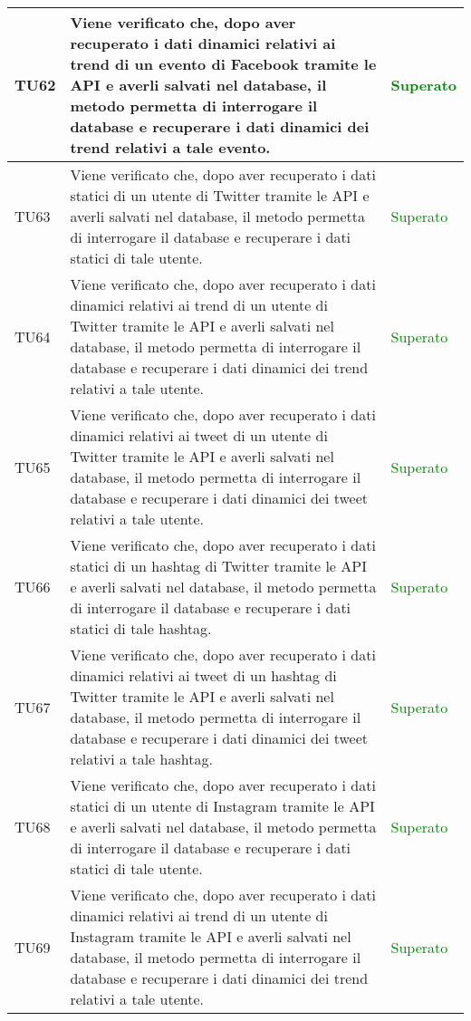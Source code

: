 \begin{center}
\begin{longtable}{| p{2cm} | p{8cm} | p{2.5cm} |}
					\hline	
					TU62 & Viene verificato che, dopo aver recuperato i dati dinamici relativi ai trend di un evento di Facebook tramite le API e averli salvati nel database, il metodo permetta di interrogare il database e recuperare i dati dinamici dei trend relativi a tale evento. & \textcolor{green}{Superato}\\
					\hline	
					TU63 & Viene verificato che, dopo aver recuperato i dati statici di un utente di Twitter tramite le API e averli salvati nel database, il metodo permetta di interrogare il database e recuperare i dati statici di tale utente. & \textcolor{green}{Superato}\\
					\hline
					TU64 & Viene verificato che, dopo aver recuperato i dati dinamici relativi ai trend di un utente di Twitter tramite le API e averli salvati nel database, il metodo permetta di interrogare il database e recuperare i dati dinamici dei trend relativi a tale utente. & \textcolor{green}{Superato}\\
					\hline	
					TU65 & Viene verificato che, dopo aver recuperato i dati dinamici relativi ai tweet di un utente di Twitter tramite le API e averli salvati nel database, il metodo permetta di interrogare il database e recuperare i dati dinamici dei tweet relativi a tale utente. & \textcolor{green}{Superato}\\
					\hline
					TU66 & Viene verificato che, dopo aver recuperato i dati statici di un hashtag di Twitter tramite le API e averli salvati nel database, il metodo permetta di interrogare il database e recuperare i dati statici di tale hashtag. & \textcolor{green}{Superato}\\
					\hline	
					TU67 & Viene verificato che, dopo aver recuperato i dati dinamici relativi ai tweet di un hashtag di Twitter tramite le API e averli salvati nel database, il metodo permetta di interrogare il database e recuperare i dati dinamici dei tweet relativi a tale hashtag. & \textcolor{green}{Superato}\\
					\hline	
					TU68 & Viene verificato che, dopo aver recuperato i dati statici di un utente di Instagram tramite le API e averli salvati nel database, il metodo permetta di interrogare il database e recuperare i dati statici di tale utente. & \textcolor{green}{Superato}\\
					\hline
					TU69 & Viene verificato che, dopo aver recuperato i dati dinamici relativi ai trend di un utente di Instagram tramite le API e averli salvati nel database, il metodo permetta di interrogare il database e recuperare i dati dinamici dei trend relativi a tale utente. & \textcolor{green}{Superato}\\

\end{longtable}
\end{center}
